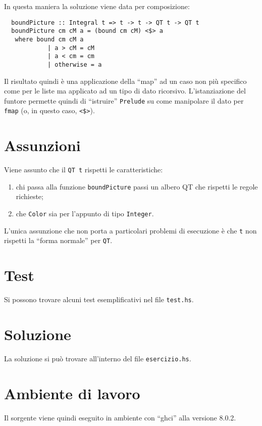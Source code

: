 \documentclass[a4paper,italian]{article}
\begin{document}
In questa maniera la soluzione viene data per composizione:
\begin{verbatim}
  boundPicture :: Integral t => t -> t -> QT t -> QT t
  boundPicture cm cM a = (bound cm cM) <$> a
   where bound cm cM a 
            | a > cM = cM
            | a < cm = cm
            | otherwise = a
\end{verbatim}

Il risultato quindi è una applicazione della ``map'' ad un caso non più specifico come per le liste
ma applicato ad un tipo di dato ricorsivo. L'istanziazione del funtore permette quindi di ``istruire'' \texttt{Prelude} su come manipolare il dato per \texttt{fmap} (o, in questo caso, \texttt{<\$>}).

\section*{Assunzioni}
Viene assunto che il \texttt{QT t} rispetti le caratteristiche:
\begin{enumerate}
	\item chi passa alla funzione \texttt{boundPicture} passi un albero QT che rispetti le regole richieste;
	\item che \texttt{Color} sia per l'appunto di tipo \texttt{Integer}.
\end{enumerate}
L'unica assunzione che non porta a particolari problemi di esecuzione è che \texttt{t} non rispetti la ``forma normale'' per \texttt{QT}.

\section*{Test}
Si possono trovare alcuni test esemplificativi nel file \texttt{test.hs}.

\section*{Soluzione}
La soluzione si può trovare all'interno del file \texttt{esercizio.hs}.

\section*{Ambiente di lavoro}
Il sorgente viene quindi eseguito in ambiente con ``ghci'' alla versione 8.0.2.
\end{document}
